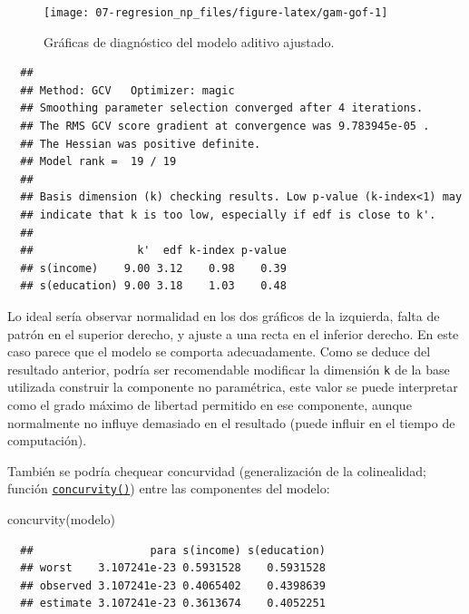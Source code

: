 \documentclass[
]{book}
\newenvironment{Shaded}{\begin{snugshade}}{\end{snugshade}}
\newcommand{\FunctionTok}[1]{\textcolor[rgb]{0.00,0.00,0.00}{#1}}
\newcommand{\NormalTok}[1]{#1}
\theoremstyle{break}
\theoremstyle{nonumberplain}
\begin{document}
\begin{figure}[!htb]

{\centering \texttt{[image: 07-regresion\_np\_files/figure-latex/gam-gof-1]} 

}

\caption{Gráficas de diagnóstico del modelo aditivo ajustado.}\label{fig:gam-gof}
\end{figure}

\begin{verbatim}
  ## 
  ## Method: GCV   Optimizer: magic
  ## Smoothing parameter selection converged after 4 iterations.
  ## The RMS GCV score gradient at convergence was 9.783945e-05 .
  ## The Hessian was positive definite.
  ## Model rank =  19 / 19 
  ## 
  ## Basis dimension (k) checking results. Low p-value (k-index<1) may
  ## indicate that k is too low, especially if edf is close to k'.
  ## 
  ##                k'  edf k-index p-value
  ## s(income)    9.00 3.12    0.98    0.39
  ## s(education) 9.00 3.18    1.03    0.48
\end{verbatim}

Lo ideal sería observar normalidad en los dos gráficos de la izquierda, falta de patrón en el superior derecho, y ajuste a una recta en el inferior derecho. En este caso parece que el modelo se comporta adecuadamente.
Como se deduce del resultado anterior, podría ser recomendable modificar la dimensión \texttt{k} de la base utilizada construir la componente no paramétrica, este valor se puede interpretar como el grado máximo de libertad permitido en ese componente, aunque normalmente no influye demasiado en el resultado (puede influir en el tiempo de computación).

También se podría chequear concurvidad (generalización de la colinealidad; función \href{https://rdrr.io/pkg/mgcv/man/concurvity.html}{\texttt{concurvity()}}) entre las componentes del modelo:

\begin{Shaded}
\begin{Highlighting}[]
\FunctionTok{concurvity}\NormalTok{(modelo)}
\end{Highlighting}
\end{Shaded}

\begin{verbatim}
  ##                  para s(income) s(education)
  ## worst    3.107241e-23 0.5931528    0.5931528
  ## observed 3.107241e-23 0.4065402    0.4398639
  ## estimate 3.107241e-23 0.3613674    0.4052251
\end{verbatim}
\end{document}
